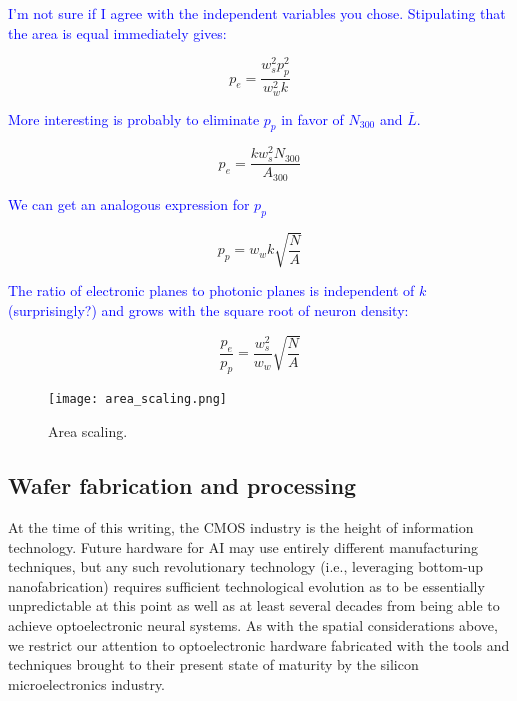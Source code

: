 \documentclass[twocolumn]{article}
\begin{document}
\textcolor{blue}{I'm not sure if I agree with the independent variables you chose. Stipulating that the area is equal immediately gives:}

\begin{equation}
    p_e = \frac{w^2_s p^2_p}{w^2_wk}
\end{equation}

\textcolor{blue}{More interesting is probably to eliminate $p_p$ in favor of $N_{300}$ and $\bar{L}$.}

\begin{equation}
    p_e = \frac{kw_{s}^2N_{300}}{A_{300}}
\end{equation}

\textcolor{blue}{We can get an analogous expression for $p_p$}

\begin{equation}
    p_p = w_wk\sqrt{\frac{N}{A}}
\end{equation}

\textcolor{blue}{The ratio of electronic planes to photonic planes is independent of $k$ (surprisingly?) and grows with the square root of neuron density:}

\begin{equation}
    \frac{p_e}{p_p} = \frac{w_s^2}{w_w}\sqrt{\frac{N}{A}}
\end{equation}

\textcolor{ForestGreen}{}
\textcolor{ForestGreen}{}
\textcolor{ForestGreen}{}

\begin{figure}
    \centering
    \texttt{[image: area\_scaling.png]}
    \caption{Area scaling.}
    \label{fig:area_scaling}
\end{figure}


\subsection{Wafer fabrication and processing}
At the time of this writing, the CMOS industry is the height of information technology. Future hardware for AI may use entirely different manufacturing techniques, but any such revolutionary technology (i.e., leveraging bottom-up nanofabrication) requires sufficient technological evolution as to be essentially unpredictable at this point as well as at least several decades from being able to achieve optoelectronic neural systems. As with the spatial considerations above, we restrict our attention to optoelectronic hardware fabricated with the tools and techniques brought to their present state of maturity by the silicon microelectronics industry.
\end{document}
